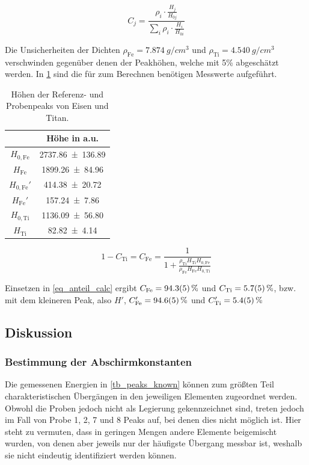 \documentclass[
	a4paper,
	12pt,
	pagesize,
	ngerman
]{scrartcl}
\begin{document}
	\begin{equation}
		\label{eq_anteil}
		C_j = \frac{\rho_i \cdot \frac{H_j}{H_{0j}}}{\sum_{i} \rho_i \cdot \frac{H_i}{H_{0i}}}
	\end{equation}
	
	Die Unsicherheiten der Dichten $\rho_\text{Fe}=\SI{7.874}{g/cm^3}$ und $\rho_\text{Ti}=\SI{4.540}{g/cm^3}$ verschwinden gegenüber denen der Peakhöhen, welche mit 5\% abgeschätzt werden. \cite{density}
	In \cref{tb_peaks} sind die für zum Berechnen benötigen Messwerte aufgeführt.
	
	\begin{table}[H]
		\centering
		\begin{tabular}{ c | c }
			 & Höhe in a.u.\\ \hline \hline
			$H_{0 , \text{Fe}}$ & \SI{2737.86+-136.89}{} \\	
			$H_{\text{Fe}}$ & \SI{1899.26+-84.96}{} \\	
			$H_{0 , \text{Fe}}'$ & \SI{414.38+-20.72}{} \\	
			$H_{\text{Fe}}'$ & \SI{157.24+-7.86}{} \\	
			$H_{0 , \text{Ti}}$ & \SI{1136.09+-56.80}{} \\	
			$H_{\text{Ti}}$ & \SI{82.82+-4.14}{} \\	
		\end{tabular}
		\caption{Höhen der Referenz- und Probenpeaks von Eisen und Titan.} %
		\label{tb_peaks} 
	\end{table}	

	\begin{equation}
		\label{eq_anteil_calc}
		1-C_\text{Ti}= C_\text{Fe} = \frac{1}{1+ \frac{\rho_\text{Ti} H_\text{Ti} H_{0,\text{Fe}}}{\rho_\text{Fe} H_\text{Fe} H_{0,\text{Ti}}}}
	\end{equation}
	
	Einsetzen in \cref{eq_anteil_calc} ergibt $C_\text{Fe}=\SI{94.3+-0.5}{\%}$ und $C_\text{Ti}=\SI{5.7+-0.5}{\%}$, bzw. mit dem kleineren Peak, also $H'$, $C_\text{Fe}'=\SI{94.6+-0.5}{\%}$ und $C_\text{Ti}'=\SI{5.4+-0.5}{\%}$
	
	\subsection{Diskussion}
	\subsubsection{Bestimmung der Abschirmkonstanten}
	Die gemessenen Energien in \cref{tb_peaks_known} können zum größten Teil charakteristischen Übergängen in den jeweiligen Elementen zugeordnet werden.
	Obwohl die Proben jedoch nicht als Legierung gekennzeichnet sind, treten jedoch im Fall von Probe 1, 2, 7 und 8 Peaks auf, bei denen dies nicht möglich ist.
	Hier steht zu vermuten, dass in geringen Mengen andere Elemente beigemischt wurden, von denen aber jeweils nur der häufigste Übergang messbar ist, weshalb sie nicht eindeutig identifiziert werden können.
	
\end{document}

